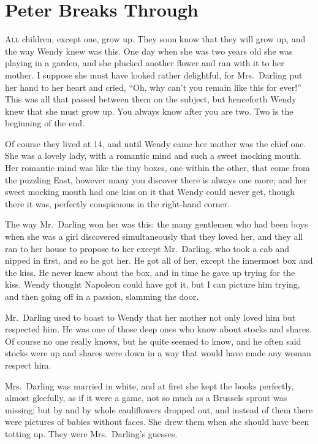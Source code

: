 \chapter{Peter Breaks Through}

\lettrine{A}{ll} children, except one, grow up. They soon know that they will
grow up, and the way Wendy knew was this. One day when she was two years old she
was playing in a garden, and she plucked another flower and ran with it to her
mother. I suppose she must have looked rather delightful, for Mrs.\ Darling put
her hand to her heart and cried, ``Oh, why can't you remain like this for
ever!'' This was all that passed between them on the subject, but henceforth
Wendy knew that she must grow up. You always know after you are two. Two is the
beginning of the end.

Of course they lived at 14, and until Wendy came her mother was the chief one.
She was a lovely lady, with a romantic mind and such a sweet mocking mouth. Her
romantic mind was like the tiny boxes, one within the other, that come from the
puzzling East, however many you discover there is always one more; and her sweet
mocking mouth had one kiss on it that Wendy could never get, though there it
was, perfectly conspicuous in the right-hand corner.

The way Mr.\ Darling won her was this: the many gentlemen who had been boys when
she was a girl discovered simultaneously that they loved her, and they all ran
to her house to propose to her except Mr.\ Darling, who took a cab and nipped in
first, and so he got her. He got all of her, except the innermost box and the
kiss. He never knew about the box, and in time he gave up trying for the kiss.
Wendy thought Napoleon could have got it, but I can picture him trying, and then
going off in a passion, slamming the door.

Mr.\ Darling used to boast to Wendy that her mother not only loved him but
respected him. He was one of those deep ones who know about stocks and shares.
Of course no one really knows, but he quite seemed to know, and he often said
stocks were up and shares were down in a way that would have made any woman
respect him.

Mrs.\ Darling was married in white, and at first she kept the books perfectly,
almost gleefully, as if it were a game, not so much as a Brussels sprout was
missing; but by and by whole cauliflowers dropped out, and instead of them there
were pictures of babies without faces. She drew them when she should have been
totting up. They were Mrs.\ Darling's guesses.

